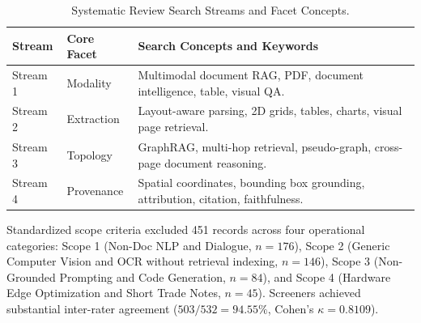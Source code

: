 \documentclass[conference,a4paper]{IEEEtran}
\begin{document}
\begin{table}[htbp]
\caption{Systematic Review Search Streams and Facet Concepts.}
\centering
\scriptsize
\setlength{\tabcolsep}{3.0pt}
\begin{tabularx}{\columnwidth}{llX}
\toprule
\textbf{Stream} & \textbf{Core Facet} & \textbf{Search Concepts and Keywords} \\
\midrule
Stream 1 & Modality & Multimodal document RAG, PDF, document intelligence, table, visual QA. \\
Stream 2 & Extraction & Layout-aware parsing, 2D grids, tables, charts, visual page retrieval. \\
Stream 3 & Topology & GraphRAG, multi-hop retrieval, pseudo-graph, cross-page document reasoning. \\
Stream 4 & Provenance & Spatial coordinates, bounding box grounding, attribution, citation, faithfulness. \\
\bottomrule
\end{tabularx}
\label{tab:search_streams}
\end{table}

Standardized scope criteria excluded 451 records across four operational categories: Scope 1 (Non-Doc NLP and Dialogue, $n = 176$), Scope 2 (Generic Computer Vision and OCR without retrieval indexing, $n = 146$), Scope 3 (Non-Grounded Prompting and Code Generation, $n = 84$), and Scope 4 (Hardware Edge Optimization and Short Trade Notes, $n = 45$). Screeners achieved substantial inter-rater agreement ($503/532 = 94.55\%$, Cohen's $\kappa = 0.8109$).
\end{document}
